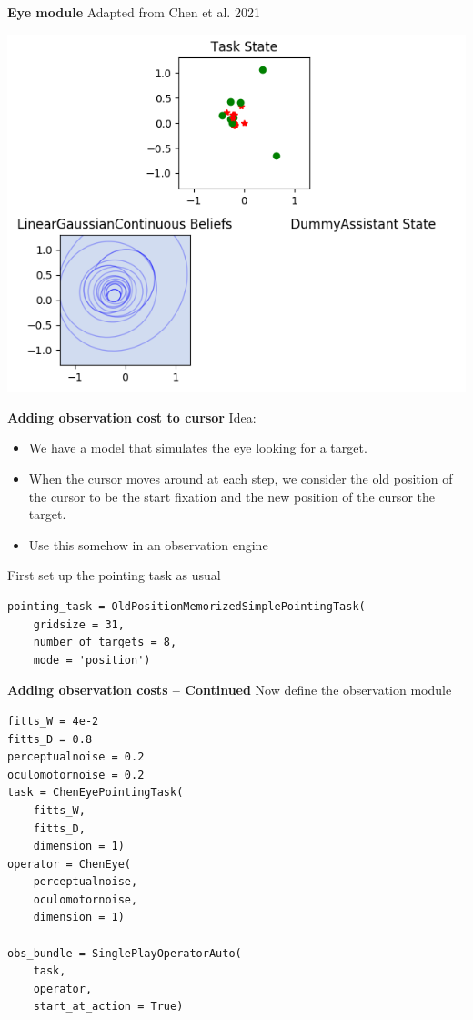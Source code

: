 \documentclass[11pt, xcolor = {dvipsnames}]{beamer}
\begin{document}
\begin{frame}{\textbf{Eye module}}
Adapted from Chen et al. 2021

\centering
\includegraphics[width=.8\textwidth]{fig/eye.png} 
\end{frame}

\begin{frame}[fragile]{\textbf{Adding observation cost to cursor}}
Idea:
\begin{itemize}
\item We have a model that simulates the eye looking for a target.
\item When the cursor moves around at each step, we consider the old position of the cursor to be the start fixation and the new position of the cursor the target.
\item Use this somehow in an observation engine
\end{itemize}

First set up the pointing task as usual

\begin{adjustbox}{width=.95\textwidth}
\lstset{language=Python}
\lstset{frame=lines}
\lstset{basicstyle=\footnotesize}
\begin{lstlisting}
pointing_task = OldPositionMemorizedSimplePointingTask(
	gridsize = 31, 
	number_of_targets = 8, 
	mode = 'position')
\end{lstlisting}
\end{adjustbox}
\end{frame}

\begin{frame}[fragile]{\textbf{Adding observation costs -- Continued}}
Now define the observation module


\begin{adjustbox}{width=.5\textwidth}
\lstset{language=Python}
\lstset{frame=lines}
\lstset{basicstyle=\footnotesize}
\begin{lstlisting}
fitts_W = 4e-2
fitts_D = 0.8
perceptualnoise = 0.2
oculomotornoise = 0.2
task = ChenEyePointingTask(
	fitts_W, 
	fitts_D, 
	dimension = 1)
operator = ChenEye( 
	perceptualnoise, 
	oculomotornoise, 
	dimension = 1)
	
obs_bundle = SinglePlayOperatorAuto(
	task, 
	operator, 
	start_at_action = True)
\end{lstlisting}
\end{adjustbox}
\end{frame}
\end{document}
